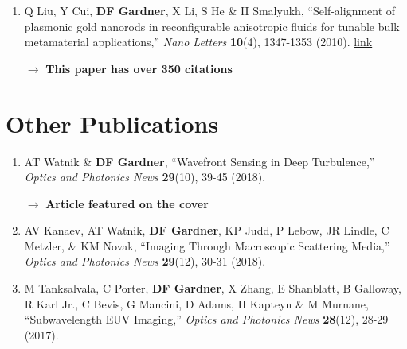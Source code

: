\documentclass[letterpaper,12pt]{article}
\begin{document}
\begin{enumerate}[leftmargin=*]
	\quad $\rightarrow$ \textbf{This paper has over 75 citations}
	
	\item  Q Liu, Y Cui, \textbf{DF Gardner}, X Li, S He \& II Smalyukh, ``Self-alignment of plasmonic gold nanorods in reconfigurable anisotropic fluids for tunable bulk metamaterial applications,''  \emph{Nano Letters} \textbf{10}(4), 1347-1353 (2010). \href{https://doi.org/10.1021/nl9042104}{link}
	
	\quad $\rightarrow$ \textbf{This paper has over 350 citations}

\end{enumerate}

\section{Other Publications}
\begin{enumerate}[leftmargin=*]
	
	\item AT Watnik \& \textbf{DF Gardner}, ``Wavefront Sensing in Deep Turbulence,''  \emph{Optics and Photonics News} \textbf{29}(10), 39-45 (2018).
	
	\quad $\rightarrow$ \textbf{Article featured on the cover}
	
	\item AV Kanaev, AT Watnik, \textbf{DF Gardner}, KP Judd, P Lebow, JR Lindle, C Metzler, \& KM Novak, ``Imaging Through Macroscopic Scattering Media,'' \emph{Optics and Photonics News} \textbf{29}(12), 30-31 (2018).
	
	\item M Tanksalvala, C Porter, \textbf{DF Gardner}, X Zhang, E Shanblatt, B Galloway, R Karl Jr., C Bevis, G Mancini, D Adams, H Kapteyn \& M Murnane, ``Subwavelength EUV Imaging,'' \emph{Optics and Photonics News} \textbf{28}(12), 28-29 (2017).
	
\end{enumerate}
\end{document}
